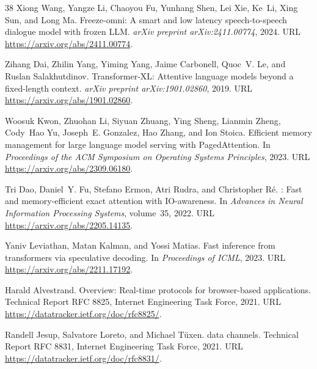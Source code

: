\documentclass[UTF8,fontset=none,a4paper,10pt]{ctexart}
\begin{document}
{\begin{thebibliography}{38}
Xiong Wang, Yangze Li, Chaoyou Fu, Yunhang Shen, Lei Xie, Ke~Li, Xing Sun, and
  Long Ma.
\newblock Freeze-omni: A smart and low latency speech-to-speech dialogue model
  with frozen {LLM}.
\newblock \emph{arXiv preprint arXiv:2411.00774}, 2024{}.
\newblock URL \url{https://arxiv.org/abs/2411.00774}.

Zihang Dai, Zhilin Yang, Yiming Yang, Jaime Carbonell, Quoc~V. Le, and Ruslan
  Salakhutdinov.
\newblock Transformer-{XL}: Attentive language models beyond a fixed-length
  context.
\newblock \emph{arXiv preprint arXiv:1901.02860}, 2019.
\newblock URL \url{https://arxiv.org/abs/1901.02860}.

Woosuk Kwon, Zhuohan Li, Siyuan Zhuang, Ying Sheng, Lianmin Zheng, Cody~Hao Yu,
  Joseph~E. Gonzalez, Hao Zhang, and Ion Stoica.
\newblock Efficient memory management for large language model serving with
  {PagedAttention}.
\newblock In \emph{Proceedings of the ACM Symposium on Operating Systems
  Principles}, 2023.
\newblock URL \url{https://arxiv.org/abs/2309.06180}.

Tri Dao, Daniel~Y. Fu, Stefano Ermon, Atri Rudra, and Christopher R{\'e}.
: Fast and memory-efficient exact attention with
  {IO}-awareness.
\newblock In \emph{Advances in Neural Information Processing Systems},
  volume~35, 2022.
\newblock URL \url{https://arxiv.org/abs/2205.14135}.

Yaniv Leviathan, Matan Kalman, and Yossi Matias.
\newblock Fast inference from transformers via speculative decoding.
\newblock In \emph{Proceedings of ICML}, 2023.
\newblock URL \url{https://arxiv.org/abs/2211.17192}.

Harald Alvestrand.
\newblock Overview: Real-time protocols for browser-based applications.
\newblock Technical Report RFC 8825, Internet Engineering Task Force, 2021.
\newblock URL \url{https://datatracker.ietf.org/doc/rfc8825/}.

Randell Jesup, Salvatore Loreto, and Michael T{\"u}xen.
 data channels.
\newblock Technical Report RFC 8831, Internet Engineering Task Force, 2021.
\newblock URL \url{https://datatracker.ietf.org/doc/rfc8831/}.


\end{thebibliography}}
\end{document}
